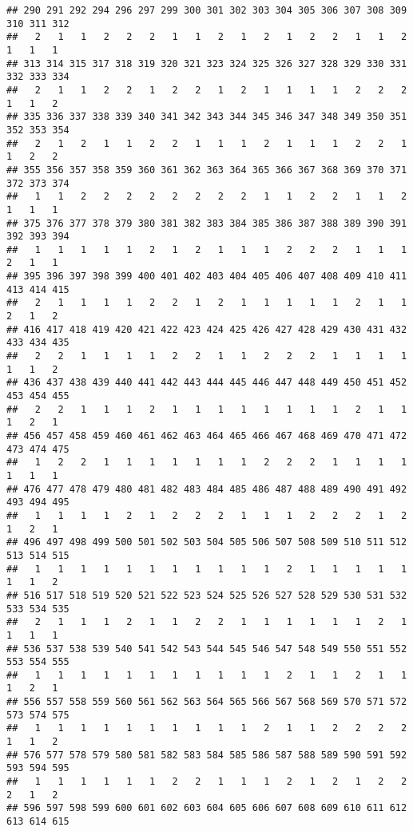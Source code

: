 \documentclass[]{article}
\begin{document}
\begin{verbatim}
## 290 291 292 294 296 297 299 300 301 302 303 304 305 306 307 308 309 310 311 312 
##   2   1   1   2   2   2   1   1   2   1   2   1   2   2   1   1   2   1   1   1 
## 313 314 315 317 318 319 320 321 323 324 325 326 327 328 329 330 331 332 333 334 
##   2   1   1   2   2   1   2   2   1   2   1   1   1   1   2   2   2   1   1   2 
## 335 336 337 338 339 340 341 342 343 344 345 346 347 348 349 350 351 352 353 354 
##   2   1   2   1   1   2   2   1   1   1   2   1   1   1   2   2   1   1   2   2 
## 355 356 357 358 359 360 361 362 363 364 365 366 367 368 369 370 371 372 373 374 
##   1   1   2   2   2   2   2   2   2   2   1   1   2   2   1   1   2   1   1   1 
## 375 376 377 378 379 380 381 382 383 384 385 386 387 388 389 390 391 392 393 394 
##   1   1   1   1   1   2   1   2   1   1   1   2   2   2   1   1   1   2   1   1 
## 395 396 397 398 399 400 401 402 403 404 405 406 407 408 409 410 411 413 414 415 
##   2   1   1   1   1   2   2   1   2   1   1   1   1   1   2   1   1   2   1   2 
## 416 417 418 419 420 421 422 423 424 425 426 427 428 429 430 431 432 433 434 435 
##   2   2   1   1   1   1   2   2   1   1   2   2   2   1   1   1   1   1   1   2 
## 436 437 438 439 440 441 442 443 444 445 446 447 448 449 450 451 452 453 454 455 
##   2   2   1   1   1   2   1   1   1   1   1   1   1   1   2   1   1   1   2   1 
## 456 457 458 459 460 461 462 463 464 465 466 467 468 469 470 471 472 473 474 475 
##   1   2   2   1   1   1   1   1   1   1   2   2   2   1   1   1   1   1   1   1 
## 476 477 478 479 480 481 482 483 484 485 486 487 488 489 490 491 492 493 494 495 
##   1   1   1   1   2   1   2   2   2   1   1   1   2   2   2   1   2   1   2   1 
## 496 497 498 499 500 501 502 503 504 505 506 507 508 509 510 511 512 513 514 515 
##   1   1   1   1   1   1   1   1   1   1   1   2   1   1   1   1   1   1   1   2 
## 516 517 518 519 520 521 522 523 524 525 526 527 528 529 530 531 532 533 534 535 
##   2   1   1   1   2   1   1   2   2   1   1   1   1   1   1   2   1   1   1   1 
## 536 537 538 539 540 541 542 543 544 545 546 547 548 549 550 551 552 553 554 555 
##   1   1   1   1   1   1   1   1   1   1   1   2   1   1   2   1   1   1   2   1 
## 556 557 558 559 560 561 562 563 564 565 566 567 568 569 570 571 572 573 574 575 
##   1   1   1   1   1   1   1   1   1   1   2   1   1   2   2   2   2   1   1   2 
## 576 577 578 579 580 581 582 583 584 585 586 587 588 589 590 591 592 593 594 595 
##   1   1   1   1   1   1   2   2   1   1   1   2   1   2   1   2   2   2   1   2 
## 596 597 598 599 600 601 602 603 604 605 606 607 608 609 610 611 612 613 614 615 

\end{verbatim}
\end{document}
